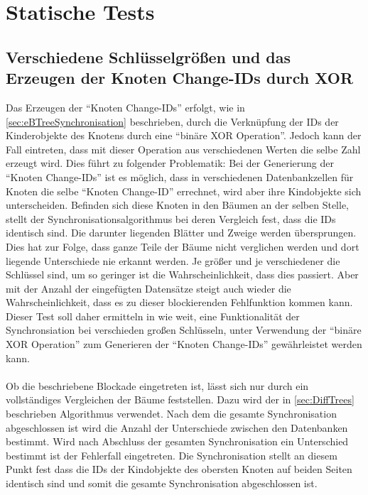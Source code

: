 \documentclass[a4paper,11pt,oneside,%
headsepline,												%
footsepline,												%
bibtotocnumbered									%
]{scrreprt}
\begin{document}
\newpage
\section{Statische Tests}
\subsection{Verschiedene Schlüsselgrößen und das Erzeugen der Knoten Change-IDs durch XOR}
\label{ssec:XorError}
Das Erzeugen der \enquote{Knoten Change-IDs} erfolgt, wie in \autoref{sec:eBTreeSynchronisation} beschrieben, durch die Verknüpfung der IDs der Kinderobjekte des Knotens durch eine \enquote{binäre XOR Operation}. Jedoch kann der Fall eintreten, dass mit dieser Operation aus verschiedenen Werten die selbe Zahl erzeugt wird. Dies führt zu folgender Problematik: Bei der Generierung der \enquote{Knoten Change-IDs} ist es möglich, dass in verschiedenen Datenbankzellen für Knoten die selbe \enquote{Knoten Change-ID} errechnet, wird aber ihre Kindobjekte sich unterscheiden. Befinden sich diese Knoten in den Bäumen an der selben Stelle, stellt der Synchronisationsalgorithmus bei deren Vergleich fest, dass die IDs identisch sind. Die darunter liegenden Blätter und Zweige werden übersprungen. Dies hat zur Folge, dass ganze Teile der Bäume nicht verglichen werden und dort liegende Unterschiede nie erkannt werden. Je größer und je verschiedener die Schlüssel sind, um so geringer ist die Wahrscheinlichkeit, dass dies passiert. Aber mit der Anzahl der eingefügten Datensätze steigt auch wieder die Wahrscheinlichkeit, dass es zu dieser blockierenden Fehlfunktion kommen kann. Dieser Test soll daher ermitteln in wie weit, eine Funktionalität der Synchronsiation bei verschieden großen Schlüsseln, unter Verwendung der \enquote{binäre XOR Operation} zum Generieren der \enquote{Knoten Change-IDs} gewährleistet werden kann.\\\\
Ob die beschriebene Blockade eingetreten ist, lässt sich nur durch ein vollständiges Vergleichen der Bäume feststellen. Dazu wird der in \autoref{sec:DiffTrees} beschrieben Algorithmus verwendet. Nach dem die gesamte Synchronisation abgeschlossen ist wird die Anzahl der Unterschiede zwischen den Datenbanken bestimmt. Wird nach Abschluss der gesamten Synchronisation ein Unterschied bestimmt ist der Fehlerfall eingetreten. Die Synchronisation stellt an diesem Punkt fest dass die IDs der Kindobjekte des obersten Knoten auf beiden Seiten identisch sind und somit die gesamte Synchronisation abgeschlossen ist. \\\\
\end{document}
